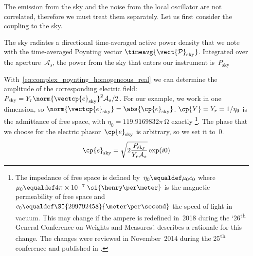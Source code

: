 \begin{refsection}
The emission from the sky and the noise from the local oscillator are not correlated, therefore we must treat them separately.
Let us first consider the coupling to the sky.

The sky radiates a directional time-averaged active power density
that we note with the time-averaged Poynting vector
$\timeavg{\vect{\mathcal{P}}_\text{sky}}$.
Integrated over the aperture~$\mathcal{A}_s$, the power from the sky that enters our instrument is~$P_\text{sky}$

With~\cref{eq:complex_poynting_homogeneous_real} we can determine the amplitude of the corresponding electric field:
$P_\text{sky} = Y_r \norm{\vectcp{e}_\text{sky}}^2 \mathcal{A}_s / 2$.
For our example, we work in one dimension, so
$\norm{\vectcp{e}_\text{sky}} = \abs{\cp{e}_\text{sky}}$.
$\cp{Y}=Y_r=1/\eta_0$ is the admittance of free space, with $\eta_0 = 119.9169832\pi~\si{\ohm}$ exactly%
\footnote{
    The impedance of free space is defined by~$\eta_0 \equaldef \mu_0 c_0$ where
    $\mu_0 \equaldef 4\pi\times10^{-7}\;\si{\henry\per\meter}$
    is the magnetic permeability of free space and
    $c_0 \equaldef \SI{299792458}{\meter\per\second}$
    the speed of light in vacuum.
    This may change if the ampere is redefined in~2018 during the
    `26\textsuperscript{th} General Conference on Weights and Measures'.
    \textcite{mills2006redefinition} describes a rationale for this change.
    The changes were reviewed in November~2014 during the 25\textsuperscript{th} conference and published in \textcite{resolutioncgpm2014}.
}.
The phase that we choose for the electric phasor~$\cp{e}_\text{sky}$ is arbitrary, so we set it to~0.
\begin{equation}
    \cp{e}_\text{sky} = \sqrt{
        2
        \frac{P_\text{sky}}{Y_r \mathcal{A}_s}
    } \exp(i0)
\end{equation}


\end{refsection}
